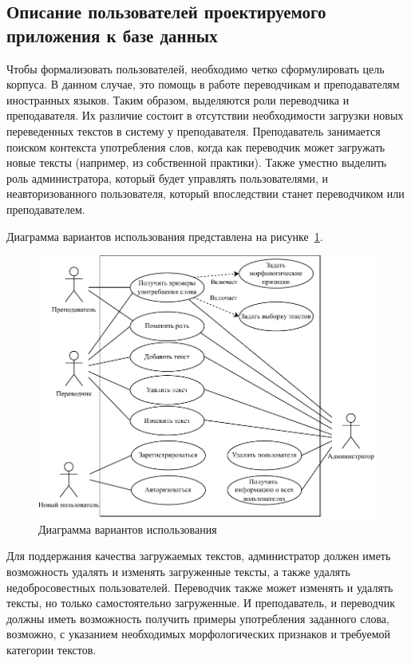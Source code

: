 \subsection{Описание пользователей проектируемого приложения к базе данных}\label{users}

Чтобы формализовать пользователей, необходимо четко сформулировать цель корпуса. 
В данном случае, это помощь в работе переводчикам и преподавателям иностранных языков. 
Таким образом, выделяются роли переводчика и преподавателя. 
Их различие состоит в отсутствии необходимости загрузки новых переведенных текстов в систему у преподавателя. Преподаватель занимается поиском контекста употребления слов, когда как переводчик может загружать новые тексты (например, из собственной практики). 
Также уместно выделить роль администратора, который будет управлять пользователями, и неавторизованного пользователя, который впоследствии станет переводчиком или преподавателем.

Диаграмма вариантов использования представлена на рисунке~\ref{use-case}.

\begin{figure}[ht]
	\centering
	\includegraphics[width=\textwidth]{img/use-case.pdf}
	\caption{Диаграмма вариантов использования}
	\label{use-case}
\end{figure}

Для поддержания качества загружаемых текстов, администратор должен иметь возможность удалять и изменять загруженные тексты, а также удалять недобросовестных пользователей. 
Переводчик также может изменять и удалять тексты, но только самостоятельно загруженные. 
И преподаватель, и переводчик должны иметь возможность получить примеры употребления заданного слова, возможно, с указанием необходимых морфологических признаков и требуемой категории текстов.

